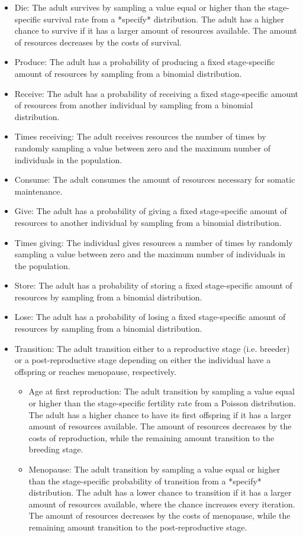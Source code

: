\documentclass{article}
\begin{document}
\begin{itemize}
    \item Die: The adult survives by sampling a value equal or higher than the stage-specific survival rate from a *specify* distribution. The adult has a higher chance to survive if it has a larger amount of resources available. The amount of resources decreases by the costs of survival.
    \item Produce: The adult has a probability of producing a fixed stage-specific amount of resources by sampling from a binomial distribution.
    \item Receive: The adult has a probability of receiving a fixed stage-specific amount of resources from another individual by sampling from a binomial distribution.
    \item Times receiving: The adult receives resources the number of times by randomly sampling a value between zero and the maximum number of individuals in the population.
    \item Consume: The adult consumes the amount of resources necessary for somatic maintenance.
    \item Give: The adult has a probability of giving a fixed stage-specific amount of resources to another individual by sampling from a binomial distribution.
    \item Times giving: The individual gives resources a number of times by randomly sampling a value between zero and the maximum number of individuals in the population.
    \item Store: The adult has a probability of storing a fixed stage-specific amount of resources by sampling from a binomial distribution.
    \item Lose: The adult has a probability of losing a fixed stage-specific amount of resources by sampling from a binomial distribution.
    \item Transition: The adult transition either to a reproductive stage (i.e. breeder) or a post-reproductive stage depending on either the individual have a offspring or reaches menopause, respectively.
    \begin{itemize}
        \item Age at first reproduction: The adult transition by sampling a value equal or higher than the stage-specific fertility rate from a Poisson distribution. The adult has a higher chance to have its first offspring if it has a larger amount of resources available. The amount of resources decreases by the costs of reproduction, while the remaining amount transition to the breeding stage.
        \item Menopause: The adult transition by sampling a value equal or higher than the stage-specific probability of transition from a *specify* distribution. The adult has a lower chance to transition if it has a larger amount of resources available, where the chance increases every iteration. The amount of resources decreases by the costs of menopause, while the remaining amount transition to the post-reproductive stage.
    \end{itemize}
\end{itemize}
\end{document}
